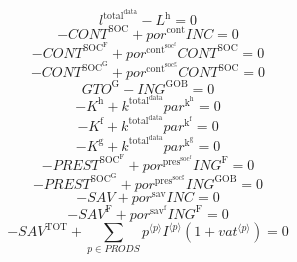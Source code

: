 \begin{equation}
l^{\mathrm{total}^{\mathrm{data}}} - L^{\mathrm{h}} = 0
\end{equation}
\begin{equation}
-{C\!O\!N\!T}^{\mathrm{SOC}} + {{p\!o\!r}^{\mathrm{cont}}} {{I\!N\!C}} = 0
\end{equation}
\begin{equation}
-{C\!O\!N\!T}^{\mathrm{SOC}^{\mathrm{F}}} + {{p\!o\!r}^{\mathrm{cont}^{\mathrm{soc}^{\mathrm{f}}}}} {{C\!O\!N\!T}^{\mathrm{SOC}}} = 0
\end{equation}
\begin{equation}
-{C\!O\!N\!T}^{\mathrm{SOC}^{\mathrm{G}}} + {{p\!o\!r}^{\mathrm{cont}^{\mathrm{soc}^{\mathrm{g}}}}} {{C\!O\!N\!T}^{\mathrm{SOC}}} = 0
\end{equation}
\begin{equation}
{G\!T\!O}^{\mathrm{G}} - {I\!N\!G}^{\mathrm{GOB}} = 0
\end{equation}
\begin{equation}
-K^{\mathrm{h}} + {k^{\mathrm{total}^{\mathrm{data}}}} {{p\!a\!r}^{\mathrm{k}^{\mathrm{h}}}} = 0
\end{equation}
\begin{equation}
-K^{\mathrm{f}} + {k^{\mathrm{total}^{\mathrm{data}}}} {{p\!a\!r}^{\mathrm{k}^{\mathrm{f}}}} = 0
\end{equation}
\begin{equation}
-K^{\mathrm{g}} + {k^{\mathrm{total}^{\mathrm{data}}}} {{p\!a\!r}^{\mathrm{k}^{\mathrm{g}}}} = 0
\end{equation}
\begin{equation}
-{P\!R\!E\!S\!T}^{\mathrm{SOC}^{\mathrm{F}}} + {{p\!o\!r}^{\mathrm{pres}^{\mathrm{soc}^{\mathrm{f}}}}} {{I\!N\!G}^{\mathrm{F}}} = 0
\end{equation}
\begin{equation}
-{P\!R\!E\!S\!T}^{\mathrm{SOC}^{\mathrm{G}}} + {{p\!o\!r}^{\mathrm{pres}^{\mathrm{soc}^{\mathrm{g}}}}} {{I\!N\!G}^{\mathrm{GOB}}} = 0
\end{equation}
\begin{equation}
-{S\!A\!V} + {{p\!o\!r}^{\mathrm{sav}}} {{I\!N\!C}} = 0
\end{equation}
\begin{equation}
-{S\!A\!V}^{\mathrm{F}} + {{p\!o\!r}^{\mathrm{sav}^{\mathrm{f}}}} {{I\!N\!G}^{\mathrm{F}}} = 0
\end{equation}
\begin{equation}
-{S\!A\!V}^{\mathrm{TOT}} + \sum_{p\in {P\!R\!O\!D\!S}} {{p}^{\langle p\rangle}} {{I}^{\langle p\rangle}} \left(1 + {{v\!a\!t}}^{\langle p\rangle}\right) = 0
\end{equation}

